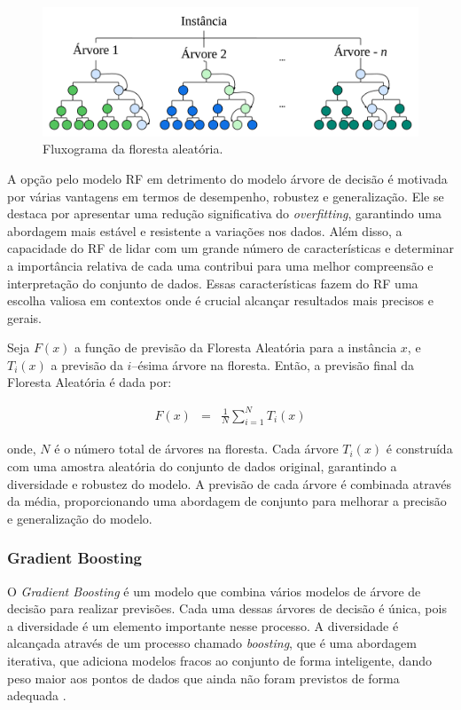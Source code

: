  \begin{figure}[!htb]
 	\centering
 	\caption{Fluxograma da floresta aleatória.}
 	\label{fig:rf}
 	\includegraphics[width=\linewidth]{Modelos/Figuras/RF.pdf}
 \end{figure}
 
A opção pelo modelo RF em detrimento do modelo árvore de decisão é motivada por várias vantagens em termos de desempenho, robustez e generalização. Ele se destaca por apresentar uma redução significativa do \textit{overfitting}, garantindo uma abordagem mais estável e resistente a variações nos dados. Além disso, a capacidade do RF de lidar com um grande número de características e determinar a importância relativa de cada uma contribui para uma melhor compreensão e interpretação do conjunto de dados. Essas características fazem do RF uma escolha valiosa em contextos onde é crucial alcançar resultados mais precisos e gerais.

Seja $ F(x) $ a função de previsão da Floresta Aleatória para a instância $ x $, e $ T_i(x) $ a previsão da $ i $--ésima árvore na floresta. Então, a previsão final da Floresta Aleatória é dada por:

\begin{eqnarray}
	F(x) &=& \frac{1}{N} \sum_{i=1}^{N} T_i(x) 
\end{eqnarray}

\noindent onde, $ N $ é o número total de árvores na floresta. Cada árvore $ T_i(x) $ é construída com uma amostra aleatória do conjunto de dados original, garantindo a diversidade e robustez do modelo. A previsão de cada árvore é combinada através da média, proporcionando uma abordagem de conjunto para melhorar a precisão e generalização do modelo.
 
 \subsubsection{Gradient Boosting}\label{subsubsec:lgbxgb}
 
 O \textit{Gradient Boosting} é um modelo que combina vários modelos de árvore de decisão para realizar previsões. Cada uma dessas árvores de decisão é única, pois a diversidade é um elemento importante nesse processo. A diversidade é alcançada através de um processo chamado \textit{boosting}, que é uma abordagem iterativa, que adiciona modelos fracos ao conjunto de forma inteligente, dando peso maior aos pontos de dados que ainda não foram previstos de forma adequada \cite{BUEECHI2023109596}. 
 
